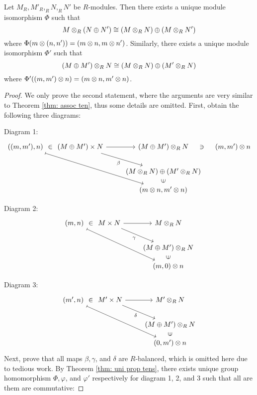 \begin{thm} 
    Let $M_R, M'_R, _RN, _RN'$ be $R$-modules. Then there exists a unique module isomorphism $\Phi$ such that 
    \[M\otimes_R (N\oplus N') \cong (M\otimes_R N) \oplus(M\otimes_R N')\]
    where $\Phi(m\otimes (n,n')) = (m\otimes n, m \otimes n')$. Similarly, there exists a unique module isomorphism $\Phi'$ such that 
    \[(M\oplus M') \otimes_R N \cong (M\otimes_R N) \oplus(M'\otimes_R N)\]
    where $\Phi'((m,m')\otimes n) = (m\otimes n, m' \otimes n)$. 
\end{thm}
\begin{proof}
    We only prove the second statement, where the arguments are very similar to Theorem \ref{thm: assoc ten}, thus some details are omitted. First, obtain the following three diagrams:

    Diagram 1:
\[\begin{tikzcd}[sep=small]
	{((m,m'),n)} & {(M\oplus M') \times N} && {(M\oplus M') \ten_R N} & {(m,m')\ten n} \\
	\\
	&&& {(M\ten _R N) \oplus (M'\ten_R N)} \\
	&&& {(m\ten n, m'\ten n)}
	\arrow["\in"{marking, allow upside down}, draw=none, from=1-1, to=1-2]
	\arrow[maps to, from=1-1, to=4-4]
	\arrow[from=1-2, to=1-4]
	\arrow["\beta"', from=1-2, to=3-4]
	\arrow["\ni"{marking, allow upside down}, draw=none, from=1-4, to=1-5]
	\arrow["\in"{marking, allow upside down}, draw=none, from=4-4, to=3-4]
\end{tikzcd}\]

Diagram 2:
\[\begin{tikzcd}[sep=small]
	{(m,n)} & {M\times N} && {M\ten_R N} \\
	\\
	&&& {(M\oplus M') \ten_R N} \\
	&&& {(m,0)\ten n}
	\arrow["\in"{marking, allow upside down}, draw=none, from=1-1, to=1-2]
	\arrow[maps to, from=1-1, to=4-4]
	\arrow[from=1-2, to=1-4]
	\arrow["\gamma"', from=1-2, to=3-4]
	\arrow["\in"{marking, allow upside down}, draw=none, from=4-4, to=3-4]
\end{tikzcd}\]

Diagram 3:
\[\begin{tikzcd}[sep=small]
	{(m',n)} & {M'\times N} && {M'\ten_R N} \\
	\\
	&&& {(M\oplus M') \ten_R N} \\
	&&& {(0,m')\ten n}
	\arrow["\in"{marking, allow upside down}, draw=none, from=1-1, to=1-2]
	\arrow[maps to, from=1-1, to=4-4]
	\arrow[from=1-2, to=1-4]
	\arrow["\delta"', from=1-2, to=3-4]
	\arrow["\in"{marking, allow upside down}, draw=none, from=4-4, to=3-4]
\end{tikzcd}\]
Next, prove that all maps $\beta, \gamma$, and $\delta$ are $R$-balanced, which is omitted here due to tedious work. By Theorem \ref{thm: uni prop tens}, there exists unique group homomorphism $\Phi, \varphi$, and $\varphi'$ respectively for diagram 1, 2, and 3 such that all are them are commutative:


\end{proof}

